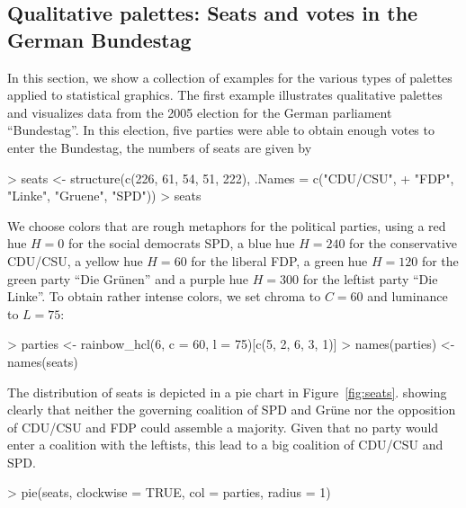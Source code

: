 \documentclass{Z}
\begin{document}
\subsection{Qualitative palettes: Seats and votes in the German Bundestag}

In this section, we show a collection of examples for the various types of palettes applied
to statistical graphics. The first example illustrates qualitative palettes
and visualizes data from the 2005 election for the German parliament ``Bundestag''.
In this election, five parties were able to obtain enough votes to enter the
Bundestag, the numbers of seats are given by

\begin{Schunk}
\begin{Sinput}
> seats <- structure(c(226, 61, 54, 51, 222), .Names = c("CDU/CSU", 
+     "FDP", "Linke", "Gruene", "SPD"))
> seats
\end{Sinput}
\end{Schunk}

We choose colors that are rough metaphors for the political parties, using a red hue $H = 0$ for the
social democrats SPD, a blue hue $H = 240$ for the conservative CDU/CSU, a yellow hue $H = 60$
for the liberal FDP, a green hue $H = 120$ for the green party ``Die Gr\"unen'' and a purple 
hue $H = 300$ for the leftist party ``Die Linke''. To obtain rather intense colors, we set
chroma to $C = 60$ and luminance to $L = 75$:

\begin{Schunk}
\begin{Sinput}
> parties <- rainbow_hcl(6, c = 60, l = 75)[c(5, 2, 6, 3, 1)]
> names(parties) <- names(seats)
\end{Sinput}
\end{Schunk}

The distribution of seats is depicted in a pie chart in Figure~\ref{fig:seats}.
showing clearly that neither the governing
coalition of SPD and Gr\"une nor the opposition of CDU/CSU and FDP could assemble a majority.
Given that no party would enter a coalition with the leftists, this lead to a big coalition
of CDU/CSU and SPD. 
\begin{Schunk}
\begin{Sinput}
> pie(seats, clockwise = TRUE, col = parties, radius = 1)
\end{Sinput}
\end{Schunk}
\end{document}

